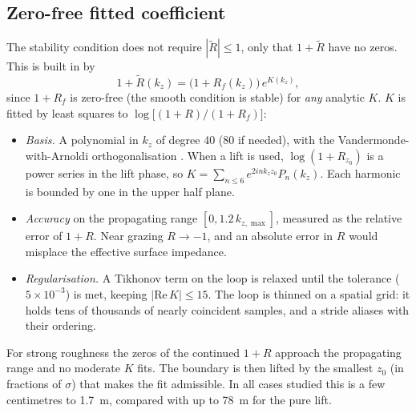 \documentclass[11pt,a4paper]{article}
\newcommand{\kz}{k_z}
\newcommand{\Rt}{\tilde R}
\begin{document}
\subsection{Zero-free fitted coefficient}
The stability condition does not require $|\Rt|\le1$, only that $1+\Rt$ have no
zeros. This is built in by
\begin{equation}
  1+\Rt(\kz)=\bigl(1+R_f(\kz)\bigr)\,e^{K(\kz)},
\end{equation}
since $1+R_f$ is zero-free (the smooth condition is stable) for \emph{any} analytic
$K$. $K$ is fitted by least squares to $\log\bigl[(1+R)/(1+R_f)\bigr]$:
\begin{itemize}
\item \emph{Basis.} A polynomial in $\kz$ of degree 40 (80 if needed), with the
  Vandermonde-with-Arnoldi orthogonalisation \cite{brubeck2021}. When a lift is
  used, $\log(1+R_{z_0})$ is a power series in the lift phase, so
  $K=\sum_{n\le6}e^{2in\kz z_0}P_n(\kz)$. Each harmonic is bounded by one in the
  upper half plane.
\item \emph{Accuracy} on the propagating range $[0,1.2\,k_{z,\max}]$, measured as the
  relative error of $1+R$. Near grazing $R\to-1$, and an absolute error in $R$
  would misplace the effective surface impedance.
\item \emph{Regularisation.} A Tikhonov term on the loop is relaxed until the
  tolerance ($5\times10^{-3}$) is met, keeping $|\mathrm{Re}\,K|\le15$. The loop is
  thinned on a spatial grid: it holds tens of thousands of nearly coincident
  samples, and a stride aliases with their ordering.
\end{itemize}
For strong roughness the zeros of the continued $1+R$ approach the propagating
range and no moderate $K$ fits. The boundary is then lifted by the smallest $z_0$
(in fractions of $\sigma$) that makes the fit admissible. In all cases studied
this is a few centimetres to \SI{1.7}{m}, compared with up to \SI{78}{m} for the pure lift.
\end{document}
